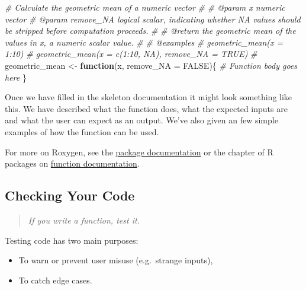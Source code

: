 \documentclass[
  12pt,
]{book}
\newenvironment{Shaded}{\begin{snugshade}}{\end{snugshade}}
\newcommand{\AttributeTok}[1]{\textcolor[rgb]{0.77,0.63,0.00}{#1}}
\newcommand{\CommentTok}[1]{\textcolor[rgb]{0.56,0.35,0.01}{\textit{#1}}}
\newcommand{\ConstantTok}[1]{\textcolor[rgb]{0.00,0.00,0.00}{#1}}
\newcommand{\ControlFlowTok}[1]{\textcolor[rgb]{0.13,0.29,0.53}{\textbf{#1}}}
\newcommand{\NormalTok}[1]{#1}
\newcommand{\OtherTok}[1]{\textcolor[rgb]{0.56,0.35,0.01}{#1}}
\providecommand{\tightlist}{%
  \setlength{\itemsep}{0pt}\setlength{\parskip}{0pt}}
\begin{document}
\begin{Shaded}
\begin{Highlighting}[]
\CommentTok{\#\textquotesingle{} Calculate the geometric mean of a numeric vector}
\CommentTok{\#\textquotesingle{}}
\CommentTok{\#\textquotesingle{} @param x numeric vector}
\CommentTok{\#\textquotesingle{} @param remove\_NA logical scalar, indicating whether NA values should be stripped before computation proceeds. }
\CommentTok{\#\textquotesingle{}}
\CommentTok{\#\textquotesingle{} @return the geometric mean of the values in \textasciigrave{}x\textasciigrave{}, a numeric scalar value. }
\CommentTok{\#\textquotesingle{}}
\CommentTok{\#\textquotesingle{} @examples}
\CommentTok{\#\textquotesingle{} geometric\_mean(x = 1:10)}
\CommentTok{\#\textquotesingle{} geometric\_mean(x = c(1:10, NA), remove\_NA = TRUE)}
\CommentTok{\#\textquotesingle{} }
\NormalTok{geometric\_mean }\OtherTok{\textless{}{-}} \ControlFlowTok{function}\NormalTok{(x, }\AttributeTok{remove\_NA =} \ConstantTok{FALSE}\NormalTok{)\{}
  \CommentTok{\# Function body goes here}
\NormalTok{\}}
\end{Highlighting}
\end{Shaded}

Once we have filled in the skeleton documentation it might look something like this. We have described what the function does, what the expected inputs are and what the user can expect as an output. We've also given an few simple examples of how the function can be used.

For more on Roxygen, see the \href{https://roxygen2.r-lib.org/}{package documentation} or the chapter of R packages on \href{https://r-pkgs.org/man.html}{function documentation}.

\hypertarget{checking-your-code}{%
\subsection{Checking Your Code}\label{checking-your-code}}

\begin{quote}
\emph{If you write a function, test it.}
\end{quote}

Testing code has two main purposes:

\begin{itemize}
\tightlist
\item
  To warn or prevent user misuse (e.g.~strange inputs),
\item
  To catch edge cases.
\end{itemize}
\end{document}

